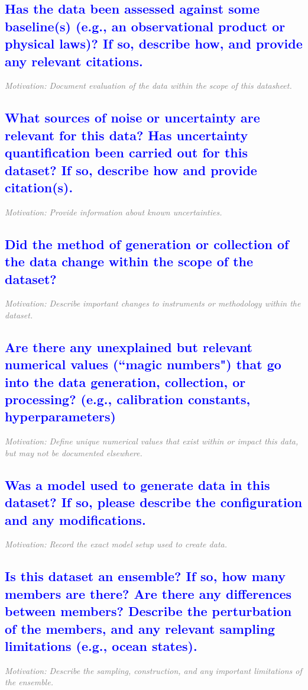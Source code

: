 \documentclass[letterpaper, 10 pt, transmag]{IEEEtran}
\begin{document}
\textcolor{blue}{\subsection{Has the data been assessed against some baseline(s) (e.g., an observational product or physical laws)? If so, describe how, and provide any relevant citations.}}
\textcolor{gray}{\textit{Motivation: Document evaluation of the data within the scope of this datasheet.}}

\textcolor{blue}{\subsection{What sources of noise or uncertainty are relevant for this data? Has uncertainty quantification been carried out for this dataset? If so, describe how and provide citation(s).}}
\textcolor{gray}{\textit{Motivation: Provide information about known uncertainties.}}

\textcolor{blue}{\subsection{Did the method of generation or collection of the data change within the scope of the dataset?}}
\textcolor{gray}{\textit{Motivation: Describe important changes to instruments or methodology within the dataset.}}

\textcolor{blue}{\subsection{Are there any unexplained but relevant numerical values (``magic numbers") that go into the data generation, collection, or processing? (e.g., calibration constants, hyperparameters)}}
\textcolor{gray}{\textit{Motivation: Define unique numerical values that exist within or impact this data, but may not be documented elsewhere.}}

\textcolor{blue}{\subsection{Was a model used to generate data in this dataset? If so, please describe the  configuration and any modifications.}}
\textcolor{gray}{\textit{Motivation: Record the exact model setup used to create data.}}

\textcolor{blue}{\subsection{Is this dataset an ensemble? If so, how many members are there? Are there any differences between members? Describe the perturbation of the members, and any relevant sampling limitations (e.g., ocean states).}}
\textcolor{gray}{\textit{Motivation: Describe the sampling, construction, and any important limitations of the ensemble.}}
\end{document}
